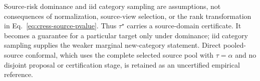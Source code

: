 Source-risk dominance and iid category sampling are assumptions, not consequences of normalization, source-view selection, or the rank transformation in Eq.~\eqref{eq:cress-source-pvalue}. Thus $\tau^\star$ carries a source-domain certificate. It becomes a guarantee for a particular target only under dominance; iid category sampling supplies the weaker marginal new-category statement. Direct pooled-source conformal, which uses the complete selected source pool with $\tau=\alpha$ and no disjoint proposal or certification stage, is retained as an uncertified empirical reference.
